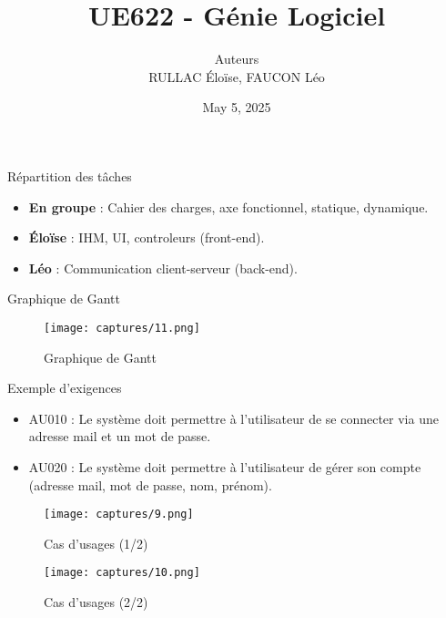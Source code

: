 \documentclass[11pt]{beamer}
\author[RULLAC FAUCON]{Auteurs \\ RULLAC Éloïse, FAUCON Léo}
\title{UE622 - Génie Logiciel}
\date{May 5, 2025}
\begin{document}
\begin{frame}
\titlepage
\end{frame}

\begin{frame}{Répartition des tâches}
    \centering
    \begin{itemize}
        \item \textbf{En groupe} : Cahier des charges, axe fonctionnel, statique, dynamique.
        \item \textbf{Éloïse} : IHM, UI, controleurs (front-end).
        \item \textbf{Léo} : Communication client-serveur (back-end).
    \end{itemize}
\end{frame}

\begin{frame}{Graphique de Gantt}
    \begin{figure}[H]
        \centering
            \texttt{[image: captures/11.png]}
            \caption{Graphique de Gantt}
    \end{figure}
\end{frame}

\begin{frame}{Exemple d'exigences}
    \centering
    \begin{itemize}
        \item AU010 : Le système doit permettre à l'utilisateur de se connecter via une adresse mail et un mot de passe.
        \item AU020 : Le système doit permettre à l'utilisateur de gérer son compte (adresse mail, mot de passe, nom, prénom).
    \end{itemize}
\end{frame}

\begin{frame}
    \begin{figure}[H]
        \centering
            \texttt{[image: captures/9.png]}
            \caption{Cas d'usages (1/2)}
    \end{figure}
\end{frame}

\begin{frame}
    \begin{figure}[H]
        \centering
            \texttt{[image: captures/10.png]}
            \caption{Cas d'usages (2/2)}
    \end{figure}
\end{frame}
\end{document}

